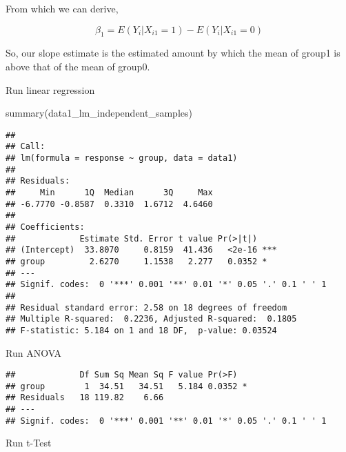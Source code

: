 \documentclass[
]{book}
\newenvironment{Shaded}{\begin{snugshade}}{\end{snugshade}}
\newcommand{\AttributeTok}[1]{\textcolor[rgb]{0.77,0.63,0.00}{#1}}
\newcommand{\FunctionTok}[1]{\textcolor[rgb]{0.00,0.00,0.00}{#1}}
\newcommand{\NormalTok}[1]{#1}
\newcommand{\OtherTok}[1]{\textcolor[rgb]{0.56,0.35,0.01}{#1}}
\newcommand{\SpecialCharTok}[1]{\textcolor[rgb]{0.00,0.00,0.00}{#1}}
\begin{document}
From which we can derive,

\[
\beta_1 = E(Y_i|X_{i1}=1) - E(Y_i|X_{i1}=0)
\]

So, our slope estimate is the estimated amount by which the mean of
group1 is above that of the mean of group0.

Run linear regression

\begin{Shaded}
\begin{Highlighting}[]
\FunctionTok{summary}\NormalTok{(data1\_lm\_independent\_samples)}
\end{Highlighting}
\end{Shaded}

\begin{verbatim}
## 
## Call:
## lm(formula = response ~ group, data = data1)
## 
## Residuals:
##     Min      1Q  Median      3Q     Max 
## -6.7770 -0.8587  0.3310  1.6712  4.6460 
## 
## Coefficients:
##             Estimate Std. Error t value Pr(>|t|)    
## (Intercept)  33.8070     0.8159  41.436   <2e-16 ***
## group         2.6270     1.1538   2.277   0.0352 *  
## ---
## Signif. codes:  0 '***' 0.001 '**' 0.01 '*' 0.05 '.' 0.1 ' ' 1
## 
## Residual standard error: 2.58 on 18 degrees of freedom
## Multiple R-squared:  0.2236, Adjusted R-squared:  0.1805 
## F-statistic: 5.184 on 1 and 18 DF,  p-value: 0.03524
\end{verbatim}

Run ANOVA

\begin{Shaded}
\end{Shaded}

\begin{verbatim}
##             Df Sum Sq Mean Sq F value Pr(>F)  
## group        1  34.51   34.51   5.184 0.0352 *
## Residuals   18 119.82    6.66                 
## ---
## Signif. codes:  0 '***' 0.001 '**' 0.01 '*' 0.05 '.' 0.1 ' ' 1
\end{verbatim}

Run t-Test
\end{document}
